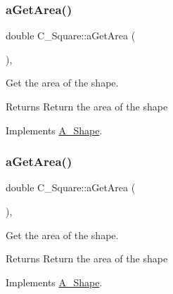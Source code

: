 \subsubsection{\texorpdfstring{a\+Get\+Area()}{aGetArea()}\hspace{0.1cm}{\footnotesize\ttfamily [1/2]}}
{\footnotesize\ttfamily double C\+\_\+\+Square\+::a\+Get\+Area (\begin{DoxyParamCaption}{ }\end{DoxyParamCaption})\hspace{0.3cm}{\ttfamily [override]}, {\ttfamily [virtual]}}



Get the area of the shape. 

\begin{DoxyReturn}{Returns}
Return the area of the shape 
\end{DoxyReturn}


Implements \hyperlink{classA__Shape_a1b142ee2d873d6c217f65de1632e7b6e}{A\+\_\+\+Shape}.

\mbox{\label{classC__Square_affd2be59872618d5d1955be360fb73e6}} 
\subsubsection{\texorpdfstring{a\+Get\+Area()}{aGetArea()}\hspace{0.1cm}{\footnotesize\ttfamily [2/2]}}
{\footnotesize\ttfamily double C\+\_\+\+Square\+::a\+Get\+Area (\begin{DoxyParamCaption}{ }\end{DoxyParamCaption})\hspace{0.3cm}{\ttfamily [override]}, {\ttfamily [virtual]}}



Get the area of the shape. 

\begin{DoxyReturn}{Returns}
Return the area of the shape 
\end{DoxyReturn}


Implements \hyperlink{classA__Shape_a1b142ee2d873d6c217f65de1632e7b6e}{A\+\_\+\+Shape}.

\mbox{\label{classC__Square_a44b1e58b20cc98edc774a73742fec9a7}} 
